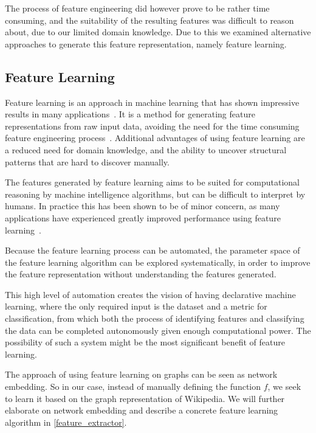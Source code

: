 The process of feature engineering did however prove to be rather time consuming, and the suitability of the resulting features was difficult to reason about, due to our limited domain knowledge. Due to this we examined alternative approaches to generate this feature representation, namely feature learning.


\subsection{Feature Learning}
Feature learning is an approach in machine learning that has shown impressive results in many applications~\cite{bengio2013representation}. It is a method for generating feature representations from raw input data, avoiding the need for the time consuming feature engineering process~\cite{ng-lecture}. Additional advantages of using feature learning are a reduced need for domain knowledge, and the ability to uncover structural patterns that are hard to discover manually.

The features generated by feature learning aims to be suited for computational reasoning by machine intelligence algorithms, but can be difficult to interpret by humans. In practice this has been shown to be of minor concern, as many applications have experienced greatly improved performance using feature learning~\cite{bengio2013representation}.

Because the feature learning process can be automated, the parameter space of the feature learning algorithm can be explored systematically, in order to improve the feature representation without understanding the features generated.

This high level of automation creates the vision of having declarative machine learning, where the only required input is the dataset and a metric for classification, from which both the process of identifying features and classifying the data can be completed autonomously given enough computational power. The possibility of such a system might be the most significant benefit of feature learning.


The approach of using feature learning on graphs can be seen as network embedding. So in our case, instead of manually defining the function $f$, we seek to learn it based on the graph representation of Wikipedia. We will further elaborate on network embedding and describe a concrete feature learning algorithm in \cref{feature_extractor}. 